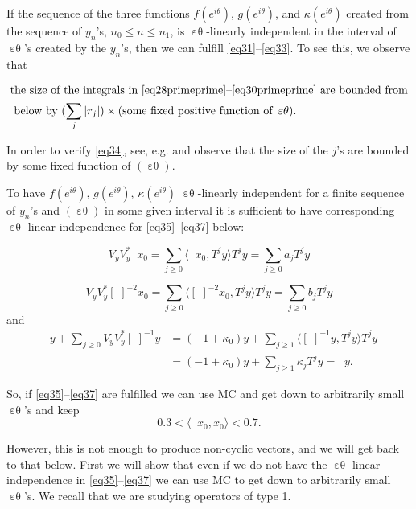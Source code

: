 \documentclass[12pt,oneside,reqno]{amsart}
\theoremstyle{definition}
\DeclareMathOperator*{\VV}{[\,\, ]^{-1}}
\DeclareMathOperator*{\VE}{\varepsilon\theta}
\begin{document}
If the sequence of the three functions  $f(e^{i \theta})$, $g(e^{i \theta})$, and $\kappa (e^{i \theta})$ created from the sequence of $y_n$'s, $n_0 \le n \le n_1$, is $\VE$-linearly independent in the interval of $\VE$'s created by the $y_n$'s, then we can fulfill \eqref{eq31}--\eqref{eq33}. To see this, we observe that  

\begin{equation}\label{eq34}
	\begin{aligned}
&\text{the size of the integrals in \eqref{eq28primeprime}--\eqref{eq30primeprime} are bounded from} \\
& \text{ below by } (\sum_j |r_j|) \times (\text{some fixed positive function of  } \VE ).
\end{aligned}
\end{equation}

In order to verify \eqref{eq34}, see, e.g. \cite{BeauzamyEnflo} and observe that the size of the $j$'s are bounded by some fixed function of $(\VE)$.

To have $f(e^{i \theta})$,  $g(e^{i \theta})$, $\kappa (e^{i \theta})$ $\VE$-linearly independent for a finite sequence of $y_n$'s and $(\VE)$ in some given interval it is sufficient to have corresponding $\VE$-linear independence for 
\eqref{eq35}--\eqref{eq37} below:

\begin{equation}\label{eq35}
	V_y V_y^* \VV x_0 = \sum_{j \ge 0} \langle \VV x_0, T^j y \rangle T^jy = \sum_{j\ge 0} a_j T^j y
\end{equation}

\begin{equation}\label{eq36}
	V_y V_y^* [\, \,]^{-2} x_0 = \sum_{j \ge 0} \langle  [\, \,]^{-2} x_0, T^j y \rangle T^jy = \sum_{j\ge 0} b_j T^j y
\end{equation}
 and
 \begin{equation}\label{eq37}
\begin{aligned}
 	-y + \sum_{j \ge 0}V_y V_y^* [\, \,]^{-1} y &= (-1+\kappa_0) y + \sum_{j \ge 1} \langle  [\, \,]^{-1} y, T^j y \rangle T^jy \\
 	& = (-1+\kappa_0) y + \sum_{j\ge 1} \kappa_j T^j y = \VV y.
\end{aligned}
 \end{equation}

 So, if \eqref{eq35}--\eqref{eq37} are fulfilled we can use MC and get down to arbitrarily small $\VE$'s and keep
 $$0.3 < \langle \VV x_0, x_0 \rangle < 0.7.$$

However, this is not enough to produce non-cyclic vectors, and we will get back to that below. First we will show that even if we do not have the $\VE$-linear independence in \eqref{eq35}--\eqref{eq37} we can use MC to get down to arbitrarily small $\VE$'s. We recall that we are studying operators of type 1. 
\end{document}

